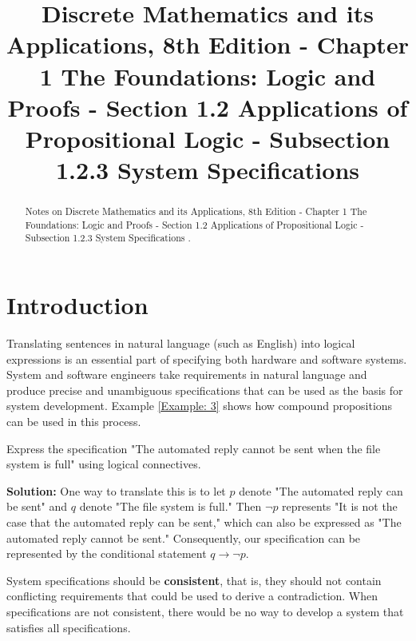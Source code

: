 \documentclass{Axon}
\title{Discrete Mathematics and its Applications, 8th Edition - Chapter 1 The Foundations: Logic and Proofs - Section 1.2 Applications of Propositional Logic - Subsection 1.2.3 System Specifications}
\begin{document}
\maketitle
\makeauthor
\begin{abstract}
Notes on Discrete Mathematics and its Applications, 8th Edition - Chapter 1 The Foundations: Logic and Proofs - Section 1.2 Applications of Propositional Logic - Subsection 1.2.3 System Specifications \cite{Rosen}.
\end{abstract}
\section{Introduction}
Translating sentences in natural language (such as English) into logical expressions is an essential part of specifying both hardware and software systems. System and software engineers take requirements in natural language and produce precise and unambiguous specifications that can be used as the basis for system development. Example \ref{Example: 3} shows how compound propositions can be used in this process.

\begin{example}\label{Example: 3}
    Express the specification "The automated reply cannot be sent when the file system is full" using logical connectives.

    \noindent
    \textbf{Solution:}
    One way to translate this is to let \(p\) denote "The automated reply can be sent" and \(q\) denote "The file system is full." Then \(\lnot p\) represents "It is not the case that the automated reply can be sent," which can also be expressed as "The automated reply cannot be sent." Consequently, our specification can be represented by the conditional statement \(q \to \lnot p\).
\end{example}

System specifications should be \textbf{consistent}, that is, they should not contain conflicting requirements that could be used to derive a contradiction. When specifications are not consistent, there would be no way to develop a system that satisfies all specifications.
\end{document}
